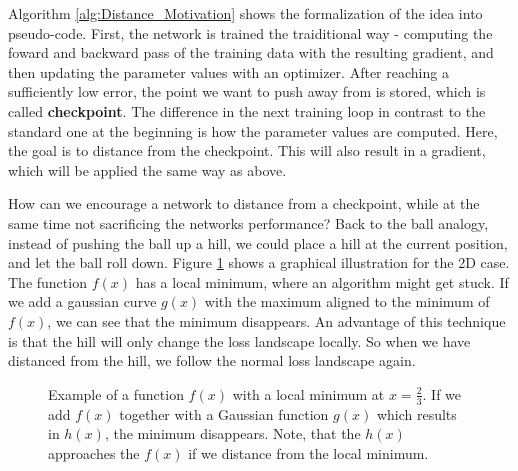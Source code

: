 Algorithm \ref{alg:Distance_Motivation} shows the formalization of the idea into
pseudo-code. First, the network is trained the traiditional way - computing the
foward and backward pass of the training data with the resulting gradient, and
then updating the parameter values with an optimizer. After reaching a
sufficiently low error, the point we want to push away from is stored, which is
called \textbf{checkpoint}. The difference in the next training loop in contrast
to the standard one at the beginning is how the parameter values are computed.
Here, the goal is to distance from the checkpoint. This will also result in a
gradient, which will be applied the same way as above.

How can we encourage a network to distance from a checkpoint, while at the same
time not sacrificing the networks performance? Back to the ball analogy, instead
of pushing the ball up a hill, we could place a hill at the current position,
and let the ball roll down. Figure \ref{fig:Distance2D} shows a graphical
illustration for the 2D case. The function $f(x)$ has a local minimum, where an
algorithm might get stuck. If we add a gaussian curve $g(x)$ with the maximum
aligned to the minimum of $f(x)$, we can see that the minimum disappears. An
advantage of this technique is that the hill will only change the loss landscape
locally. So when we have distanced from the hill, we follow the normal loss
landscape again.

\begin{figure}[h!]
    \begin{center}
        \caption{Example of a function $f(x)$ with a local minimum at $x=\frac{2}{3}$. If we add $f(x)$ together with a Gaussian function $g(x)$ which results in $h(x)$, the minimum disappears. Note, that the $h(x)$ approaches the $f(x)$ if we distance from the local minimum.}
        \label{fig:Distance2D}
    \end{center}
\end{figure}

